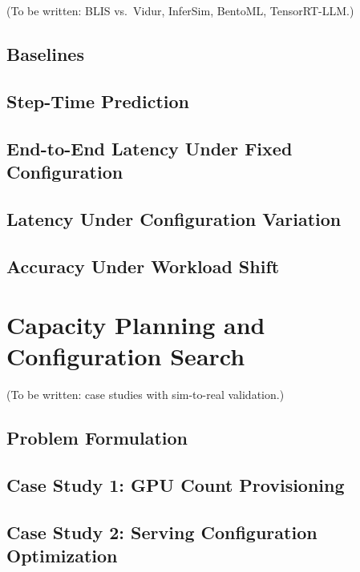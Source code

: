 \documentclass[11pt]{article}
\theoremstyle{plain} %
\theoremstyle{definition} %
\theoremstyle{remark} %
\numberwithin{equation}{section}
\begin{document}
(To be written: BLIS vs.\ Vidur, InferSim, BentoML, TensorRT-LLM.)

\subsection{Baselines}
\label{subsec:accuracy-baselines}
\subsection{Step-Time Prediction}
\label{subsec:accuracy-steptime}
\subsection{End-to-End Latency Under Fixed Configuration}
\label{subsec:accuracy-e2e-fixed}
\subsection{Latency Under Configuration Variation}
\label{subsec:accuracy-e2e-varied}
\subsection{Accuracy Under Workload Shift}
\label{subsec:accuracy-workload}

\section{Capacity Planning and Configuration Search}
\label{sec:eval-capplan}

(To be written: case studies with sim-to-real validation.)

\subsection{Problem Formulation}
\label{subsec:capplan-formulation}
\subsection{Case Study 1: GPU Count Provisioning}
\label{subsec:capplan-gpucount}
\subsection{Case Study 2: Serving Configuration Optimization}
\label{subsec:capplan-config}
\end{document}
